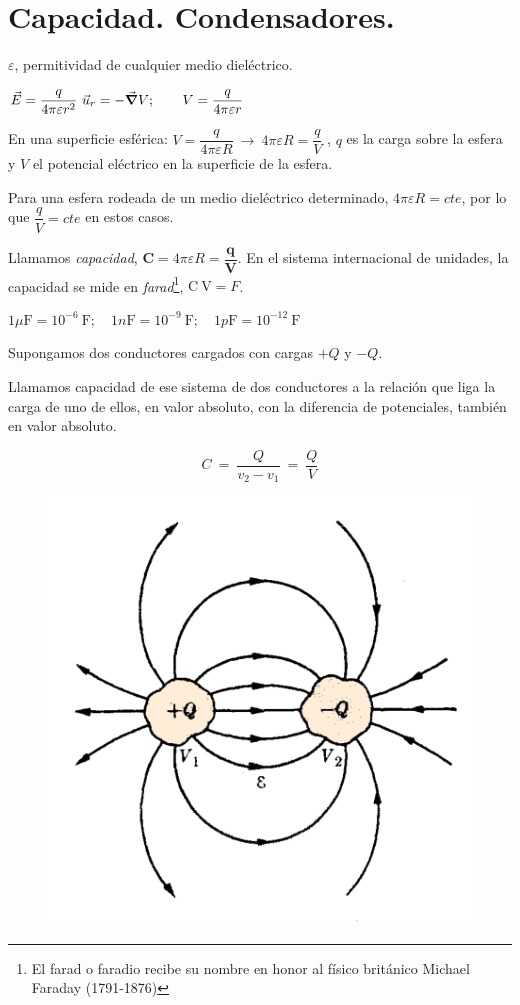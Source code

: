 \section{Capacidad. Condensadores.}

$\varepsilon$, permitividad de cualquier medio dieléctrico.

$\vec E=\dfrac {q} {4\pi \varepsilon r^2} \ \vec u_r=-\vec {\grad} V; \qquad V=\dfrac {q} {4\pi \varepsilon r} $

En una superficie esférica: $V=\dfrac {q} {4\pi \varepsilon R} \ \to \ 4 \pi \varepsilon R= \dfrac q V$ , $q$ es la carga sobre la esfera y $V$ el potencial eléctrico en la superficie de la esfera.

Para una esfera rodeada de un medio dieléctrico determinado, $4\pi \varepsilon R=cte$, por lo que $\dfrac q V =cte$ en estos casos.

Llamamos \emph{capacidad}, $\boldsymbol{ C=}4\pi \varepsilon R=\boldsymbol{ \dfrac q V}$.  En el sistema internacional de unidades, la capacidad se mide en \emph{farad}\footnote{El farad o faradio recibe su nombre en honor al físico británico Michael Faraday (1791-1876)}, $\mathrm {C \ V}=F$.

$1 \mu\mathrm{F} = 10^{-6} \ \mathrm{F}; \quad 1 n\mathrm{F}=10^{-9} \ \mathrm{F}; \quad 1 p\mathrm{F}=10^{-12} \ \mathrm{F}$

\begin{multicols}{2}
Supongamos dos conductores cargados con cargas $+Q$ y $-Q$.

Llamamos capacidad de ese sistema de dos conductores a la relación que liga la carga de uno de ellos, en valor absoluto,  con la diferencia de potenciales, también en valor absoluto.

$$C\ = \ \dfrac{Q}{v_2-v_1} \ = \ \dfrac Q V$$
\begin{figure}[H]
	\centering
	\includegraphics[width=.45\textwidth]{imagenes/imagenes24/T24IM11.png}
\end{figure}	
\end{multicols}

